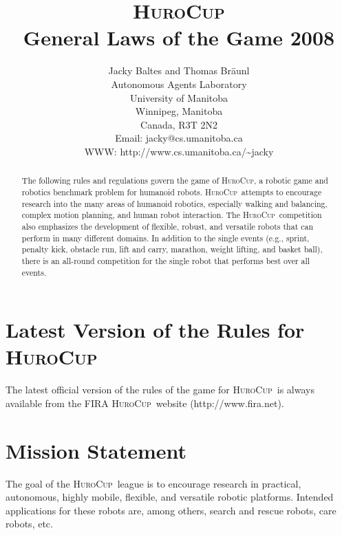 \documentclass[12pt]{article}
\newcommand{\HuroCup}{\textsc{HuroCup}}
\begin{document}
\title{\HuroCup\\
  General Laws of the Game 2008}

\author{Jacky Baltes and Thomas Br\"aunl\\
Autonomous Agents Laboratory\\
University of Manitoba\\
Winnipeg, Manitoba\\
Canada, R3T 2N2\\
Email: jacky@cs.umanitoba.ca\\
WWW: http://www.cs.umanitoba.ca/\~{ }jacky
}

\maketitle
\begin{abstract}
The following rules and regulations govern the game of \HuroCup, a
robotic game and robotics benchmark problem for humanoid
robots. 
%
\HuroCup\ attempts to encourage research into the many areas
of humanoid robotics, especially walking and balancing, complex motion
planning, and human robot interaction.
%
The \HuroCup\ competition also emphasizes the development of flexible,
robust, and versatile robots that can perform in many different
domains. 
%
In addition to the single events (e.g., sprint, penalty kick, obstacle
run, lift and carry, marathon, weight lifting, and basket ball), there
is an all-round competition for the single robot that performs best
over all events.
\end{abstract}

\section*{Latest Version of the Rules for \HuroCup}
\label{sec:updates}

The latest official version of the rules of the game for \HuroCup\ is
always available from the FIRA \HuroCup\ website (http://www.fira.net).

\newpage

\section{Mission Statement}

The goal of the \HuroCup\ league is to encourage research in
practical, autonomous, highly mobile, flexible, and versatile robotic
platforms. Intended applications for these robots are, among others,
search and rescue robots, care robots, etc.
\end{document}
